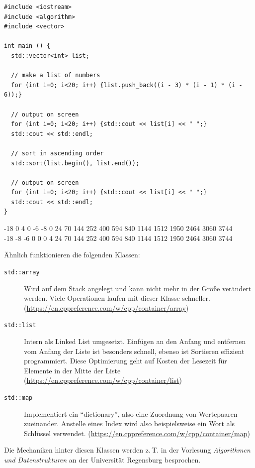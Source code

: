 \begin{codebox}
\begin{verbatim}
#include <iostream>
#include <algorithm>
#include <vector>

int main () {
  std::vector<int> list;
  
  // make a list of numbers
  for (int i=0; i<20; i++) {list.push_back((i - 3) * (i - 1) * (i - 6));}
  
  // output on screen
  for (int i=0; i<20; i++) {std::cout << list[i] << " ";}
  std::cout << std::endl;
  
  // sort in ascending order
  std::sort(list.begin(), list.end());
  
  // output on screen
  for (int i=0; i<20; i++) {std::cout << list[i] << " ";}
  std::cout << std::endl;
}
\end{verbatim}
\end{codebox}

\begin{cmdbox}
-18 0 4 0 -6 -8 0 24 70 144 252 400 594 840 1144 1512 1950 2464 3060 3744\\ 
-18 -8 -6 0 0 0 4 24 70 144 252 400 594 840 1144 1512 1950 2464 3060 3744
\end{cmdbox}

Ähnlich funktionieren die folgenden Klassen:
\begin{description}
\item [\texttt{std::array}]
	Wird auf dem Stack angelegt und kann nicht mehr in der Größe verändert werden. Viele Operationen
	laufen mit dieser Klasse schneller.
	(\url{https://en.cppreference.com/w/cpp/container/array})
\item [\texttt{std::list}]
	Intern als Linked List umgesetzt. Einfügen an den Anfang und entfernen vom Anfang der Liste ist
	besonders schnell, ebenso ist Sortieren effizient programmiert. Diese Optimierung geht auf Kosten
	der Lesezeit für Elemente in der Mitte der Liste
	(\url{https://en.cppreference.com/w/cpp/container/list})
\item [\texttt{std::map}]
	Implementiert ein \enquote{dictionary}, also eine Zuordnung von Wertepaaren zueinander. Anstelle
	eines Index wird also beispielsweise ein Wort als Schlüssel verwendet.
	(\url{https://en.cppreference.com/w/cpp/container/map})
\end{description}

Die Mechaniken hinter diesen Klassen werden z.\,T. in der Vorlesung \emph{Algorithmen und Datenstrukturen} an der Universität Regensburg besprochen.